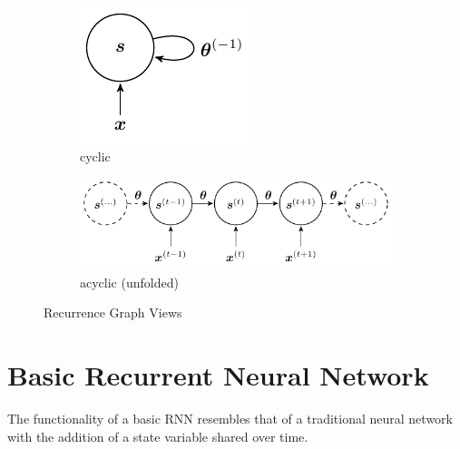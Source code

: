 \begin{figure}[H]
  \centering
  \begin{subfigure}[]{.2\textwidth}
    \begin{center}
    \includegraphics[]{figs/recurrent.pdf}
    \end{center}
    \caption{cyclic}
    \label{fig:recurrent}
  \end{subfigure}
  \begin{subfigure}[]{.79\textwidth}
    \begin{center}
    \includegraphics[]{figs/recurrent_uf.pdf}
    \end{center}
    \caption{acyclic (unfolded)}
    \label{fig:recurrent_uf}
  \end{subfigure}
  \caption{Recurrence Graph Views}
  \label{fig:recurrence}
\end{figure}


\section{Basic Recurrent Neural Network}

The functionality of a basic RNN resembles that of a traditional neural network with the addition of a state variable shared over time.


